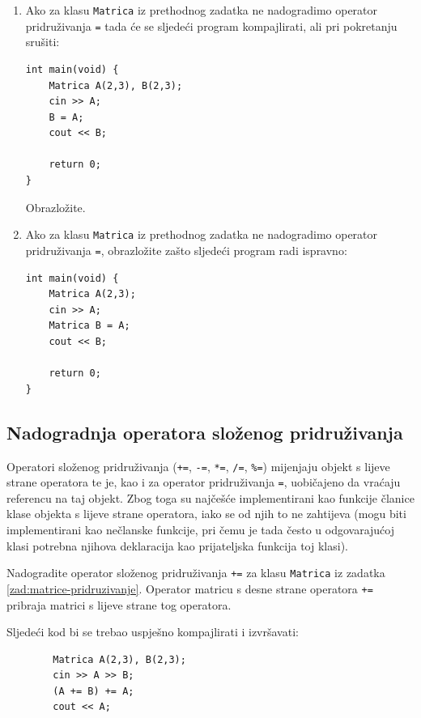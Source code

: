\begin{razmisljanje}
    \begin{enumerate}
        \item 
         Ako za klasu \texttt{Matrica}
         iz prethodnog zadatka ne nadogradimo operator pridruživanja \texttt{=}
         tada će se sljedeći program kompajlirati, ali pri pokretanju srušiti:
        \begin{verbatim}
int main(void) {
    Matrica A(2,3), B(2,3);
    cin >> A;
    B = A;
    cout << B;

    return 0;
}
        \end{verbatim}
    Obrazložite.

    \item 
    Ako za klasu \texttt{Matrica}
         iz prethodnog zadatka ne nadogradimo operator pridruživanja \texttt{=},
         obrazložite zašto sljedeći program radi ispravno:
    \begin{verbatim}
int main(void) {
    Matrica A(2,3);
    cin >> A;
    Matrica B = A;
    cout << B;

    return 0;
}
        \end{verbatim}
    \end{enumerate}
\end{razmisljanje}


\subsection{Nadogradnja operatora složenog pridruživanja}

Operatori složenog pridruživanja (\texttt{+=}, \texttt{-=}, \texttt{*=}, \texttt{/=}, \texttt{\%=}) 
mijenjaju objekt s lijeve strane operatora
te je, kao i za operator pridruživanja \texttt{=}, 
uobičajeno da vraćaju referencu na taj objekt.
Zbog toga su najčešće implementirani kao funkcije članice klase objekta s lijeve strane operatora,
iako se od njih to ne zahtijeva
(mogu biti implementirani kao nečlanske funkcije,
pri čemu je tada često u odgovarajućoj klasi 
potrebna njihova deklaracija kao prijateljska funkcija toj klasi).


\begin{zadatak}\label{zad:matrice-slozeno-pridruzivanje}
    Nadogradite operator složenog pridruživanja \texttt{+=} za klasu \texttt{Matrica} iz zadatka \ref{zad:matrice-pridruzivanje}.
    Operator matricu s desne strane operatora \texttt{+=} pribraja matrici s lijeve strane tog operatora.
    \medskip

    Sljedeći kod bi se trebao uspješno kompajlirati i izvršavati:
    \begin{verbatim}
        Matrica A(2,3), B(2,3);
        cin >> A >> B;
        (A += B) += A;
        cout << A;
    \end{verbatim}
\end{zadatak}


